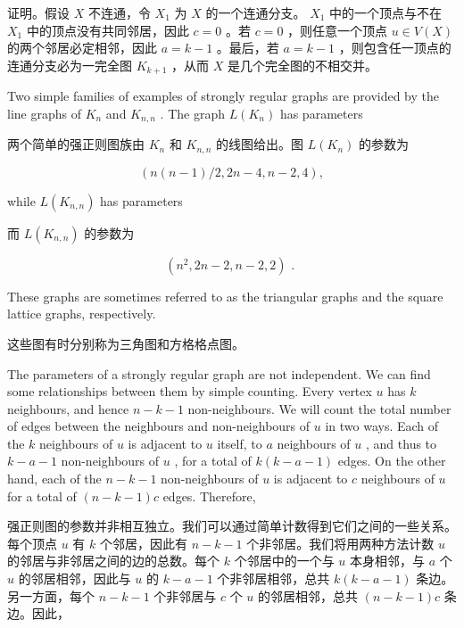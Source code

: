 \documentclass[10pt]{article}
\begin{document}
\begin{tcolorbox}\relax
证明。假设 \(X\) 不连通，令 \({X}_{1}\) 为 \(X\) 的一个连通分支。 \({X}_{1}\) 中的一个顶点与不在 \({X}_{1}\) 中的顶点没有共同邻居，因此 \(c = 0\) 。若 \(c = 0\) ，则任意一个顶点 \(u \in  V\left( X\right)\) 的两个邻居必定相邻，因此 \(a = k - 1\) 。最后，若 \(a = k - 1\) ，则包含任一顶点的连通分支必为一完全图 \({K}_{k + 1}\) ，从而 \(X\) 是几个完全图的不相交并。
\end{tcolorbox}

Two simple families of examples of strongly regular graphs are provided by the line graphs of \({K}_{n}\) and \({K}_{n,n}\) . The graph \(L\left( {K}_{n}\right)\) has parameters

\begin{tcolorbox}\relax
两个简单的强正则图族由 \({K}_{n}\) 和 \({K}_{n,n}\) 的线图给出。图 \(L\left( {K}_{n}\right)\) 的参数为
\end{tcolorbox}

\[
\left( {n\left( {n - 1}\right) /2,{2n} - 4,n - 2,4}\right) ,
\]

while \(L\left( {K}_{n,n}\right)\) has parameters

\begin{tcolorbox}\relax
而 \(L\left( {K}_{n,n}\right)\) 的参数为
\end{tcolorbox}

\[
\left( {{n}^{2},{2n} - 2,n - 2,2}\right) \text{ . }
\]

These graphs are sometimes referred to as the triangular graphs and the square lattice graphs, respectively.

\begin{tcolorbox}\relax
这些图有时分别称为三角图和方格格点图。
\end{tcolorbox}

The parameters of a strongly regular graph are not independent. We can find some relationships between them by simple counting. Every vertex \(u\) has \(k\) neighbours, and hence \(n - k - 1\) non-neighbours. We will count the total number of edges between the neighbours and non-neighbours of \(u\) in two ways. Each of the \(k\) neighbours of \(u\) is adjacent to \(u\) itself, to \(a\) neighbours of \(u\) , and thus to \(k - a - 1\) non-neighbours of \(u\) , for a total of \(k\left( {k - a - 1}\right)\) edges. On the other hand, each of the \(n - k - 1\) non-neighbours of \(u\) is adjacent to \(c\) neighbours of \(u\) for a total of \(\left( {n - k - 1}\right) c\) edges. Therefore,

\begin{tcolorbox}\relax
强正则图的参数并非相互独立。我们可以通过简单计数得到它们之间的一些关系。每个顶点 \(u\) 有 \(k\) 个邻居，因此有 \(n - k - 1\) 个非邻居。我们将用两种方法计数 \(u\) 的邻居与非邻居之间的边的总数。每个 \(k\) 个邻居中的一个与 \(u\) 本身相邻，与 \(a\) 个 \(u\) 的邻居相邻，因此与 \(u\) 的 \(k - a - 1\) 个非邻居相邻，总共 \(k\left( {k - a - 1}\right)\) 条边。另一方面，每个 \(n - k - 1\) 个非邻居与 \(c\) 个 \(u\) 的邻居相邻，总共 \(\left( {n - k - 1}\right) c\) 条边。因此，
\end{tcolorbox}
\end{document}
